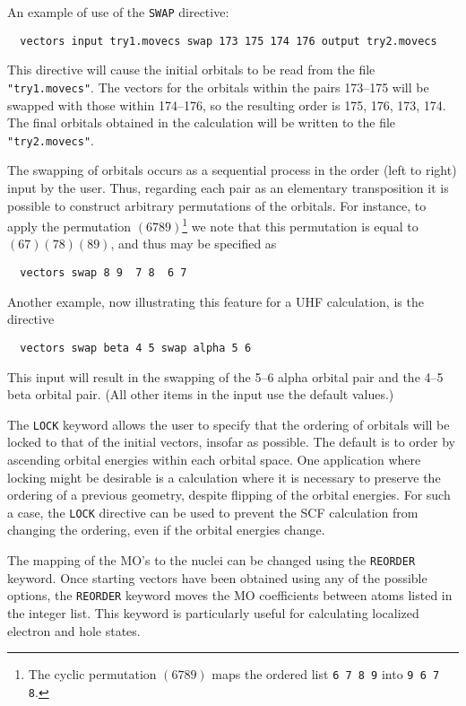An example of use of the \verb+SWAP+ directive:
\begin{verbatim}
  vectors input try1.movecs swap 173 175 174 176 output try2.movecs
\end{verbatim}
This directive will cause the initial orbitals to be read from the
file \verb+"try1.movecs"+.  The vectors for the orbitals within the
pairs 173--175 will be swapped with those within 174--176, so the
resulting order is 175, 176, 173, 174.  The final orbitals obtained in
the calculation will be written to the file \verb+"try2.movecs"+.

The swapping of orbitals occurs as a sequential process in the order
(left to right) input by the user.  Thus, regarding each pair as an
elementary transposition it is possible to construct arbitrary
permutations of the orbitals.  For instance, to apply the permutation
$(6 7 8 9)$\footnote{The cyclic permutation $(6 7 8 9)$ maps the
  ordered list {\tt 6 7 8 9} into {\tt 9 6 7 8}.} we note that this
permutation is equal to $(6 7)(7 8)(8 9)$, and thus may be specified
as
\begin{verbatim}
  vectors swap 8 9  7 8  6 7
\end{verbatim}

Another example, now illustrating this feature for a UHF calculation,
is the directive
\begin{verbatim}
  vectors swap beta 4 5 swap alpha 5 6
\end{verbatim}
This input will result in the swapping of the 5--6 alpha orbital pair
and the 4--5 beta orbital pair.  (All other items in the input use the
default values.)

The \verb+LOCK+ keyword allows the user to specify that the ordering
of orbitals will be locked to that of the initial vectors, insofar as
possible. The default is to order by ascending orbital energies within
each orbital space. One application where locking might be desirable
is a calculation where it is necessary to preserve the ordering of a
previous geometry, despite flipping of the orbital energies.  For such
a case, the \verb+LOCK+ directive can be used to prevent the SCF
calculation from changing the ordering, even if the orbital energies
change.

The mapping of the MO's to the nuclei can be changed using the \verb+REORDER+ keyword.
Once starting vectors have been obtained using any of the possible
options, the \verb+REORDER+ keyword moves the MO coefficients between atoms
listed in the integer list.  This keyword is particularly useful for calculating localized
electron and hole states.

